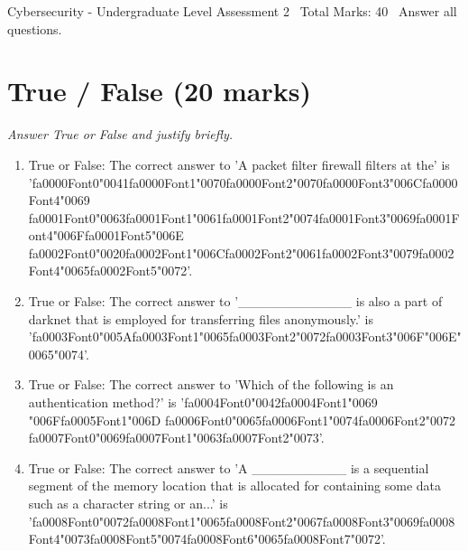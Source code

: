 \documentclass[12pt]{article}
\begin{document}
\begin{center}
Cybersecurity - Undergraduate Level Assessment 2 \
Total Marks: 40 \
Answer all questions.
\end{center}

\section*{True / False (20 marks)}
\textit{Answer True or False and justify briefly.}
\begin{enumerate}[label=\arabic*.]
\item True or False: The correct answer to 'A packet filter firewall filters at the' is '{\csname fa0000Font0\endcsname\char"0041}{\csname fa0000Font1\endcsname\char"0070}{\csname fa0000Font2\endcsname\char"0070}{\csname fa0000Font3\endcsname\char"006C}{\csname fa0000Font4\endcsname\char"0069} {\csname fa0001Font0\endcsname\char"0063}{\csname fa0001Font1\endcsname\char"0061}{\csname fa0001Font2\endcsname\char"0074}{\csname fa0001Font3\endcsname\char"0069}{\csname fa0001Font4\endcsname\char"006F}{\csname fa0001Font5\endcsname\char"006E} {\csname fa0002Font0\endcsname\char"0020}{\csname fa0002Font1\endcsname\char"006C}{\csname fa0002Font2\endcsname\char"0061}{\csname fa0002Font3\endcsname\char"0079}{\csname fa0002Font4\endcsname\char"0065}{\csname fa0002Font5\endcsname\char"0072}'.
\item True or False: The correct answer to '\_\_\_\_\_\_\_\_\_\_\_\_ is also a part of darknet that is employed for transferring files anonymously.' is '{\csname fa0003Font0\endcsname\char"005A}{\csname fa0003Font1\endcsname\char"0065}{\csname fa0003Font2\endcsname\char"0072}{\csname fa0003Font3\endcsname\char"006F}{\char"006E}{\char"0065}{\char"0074}'.
\item True or False: The correct answer to 'Which of the following is an authentication method?' is '{\csname fa0004Font0\endcsname\char"0042}{\csname fa0004Font1\endcsname\char"0069} {\char"006F}{\csname fa0005Font1\endcsname\char"006D} {\csname fa0006Font0\endcsname\char"0065}{\csname fa0006Font1\endcsname\char"0074}{\csname fa0006Font2\endcsname\char"0072} {\csname fa0007Font0\endcsname\char"0069}{\csname fa0007Font1\endcsname\char"0063}{\csname fa0007Font2\endcsname\char"0073}'.
\item True or False: The correct answer to 'A \_\_\_\_\_\_\_\_\_\_ is a sequential segment of the memory location that is allocated for containing some data such as a character string or an...' is '{\csname fa0008Font0\endcsname\char"0072}{\csname fa0008Font1\endcsname\char"0065}{\csname fa0008Font2\endcsname\char"0067}{\csname fa0008Font3\endcsname\char"0069}{\csname fa0008Font4\endcsname\char"0073}{\csname fa0008Font5\endcsname\char"0074}{\csname fa0008Font6\endcsname\char"0065}{\csname fa0008Font7\endcsname\char"0072}'.

\end{enumerate}
\end{document}

